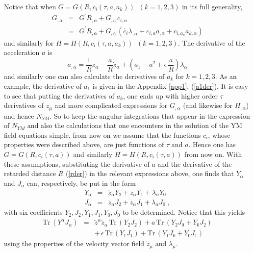 \documentclass[a4paper,twocolumn,prd,showpacs,amsmath,amssymb]{revtex4}
\begin{document}
Notice that when \(G=G(R,c_i (\tau,a,a_{k})) \;\; (k=1,2,3)\) in its full generality,
\begin{eqnarray*}
G_{,\alpha} & = & G^{\prime} R_{,\alpha} + G_{,c_i} c_{i,\alpha} \\
& = & G^{\prime} R_{,\alpha} + G_{,c_i} (\dot{c_i} \lambda_{,\alpha} +
c_{i,a} a_{,\alpha} + c_{i,a_{k}} a_{k,\alpha} )
\end{eqnarray*}
and similarly for \(H=H(R,c_i (\tau,a,a_{k})) \;\; (k=1,2,3) \). The derivative
of the acceleration $a$ is
\begin{equation}
a_{,\alpha} = \frac{1}{R} \ddot{z}_{\alpha} - \frac{a}{R} \dot{z}_{\alpha}
+ (a_{1} - a^2 + \epsilon \, \frac{a}{R}) \lambda_{\alpha} \label{asubm}
\end{equation}
and similarly one can also calculate the derivatives of $a_{k}$ for $k=1,2,3$.
As an example, the derivative of $a_1$ is given in the Appendix \ref{app1},
(\ref{a1der}). It is easy to see that putting the derivatives of $a_{k}$, one
ends up with higher order $\tau$ derivatives of $z_{\mu}$ and more complicated expressions
for $G_{,\alpha}$ (and likewise for $H_{,\alpha}$) and hence $N_{YM}$. So to keep
the angular integrations that appear in the expression of $N_{YM}$
and also the calculations that one encounters in the solution of the YM
field equations simple, from now on we assume that the functions $c_{i}$, whose
properties were described above, are just functions of $\tau$ and $a$. Hence
one has \(G=G(R,c_i (\tau,a)) \) and similarly \(H=H(R,c_i (\tau,a)) \)
from now on. With these assumptions, substituting the derivative of $a$ and
the derivative of the retarded distance $R$ (\ref{rder}) in the relevant
expressions above, one finds that
$Y_{\alpha}$ and $J_{\alpha}$ can, respectively, be put in the form
\begin{eqnarray*}
Y_{\alpha} & = & \ddot{z}_{\alpha} Y_2 + \dot{z}_{\alpha} Y_1 + \lambda_{\alpha} Y_0 \\
J_{\alpha} & = & \ddot{z}_{\alpha} J_2 + \dot{z}_{\alpha} J_1 + \lambda_{\alpha} J_0 \; ,
\end{eqnarray*}
with six coefficients $Y_2, J_2, Y_1, J_1, Y_0, J_0$ to be determined.
Notice that this yields
\begin{eqnarray*}
\mbox{Tr} \, (Y^{\alpha} J_{\alpha}) & = & \ddot{z}^{\alpha} \ddot{z}_{\alpha} \,
\mbox{Tr} \, (Y_2 J_2) +
a \, \mbox{Tr} \, (Y_2 J_0 + Y_0 J_2) \\
& & + \, \epsilon \, \mbox{Tr} \, (Y_1 J_1) + \mbox{Tr} \, (Y_1 J_0 + Y_0 J_1) \;
\end{eqnarray*}
using the properties of the velocity vector field $\dot{z}_{\mu}$ and $\lambda_{\mu}$.
\end{document}
